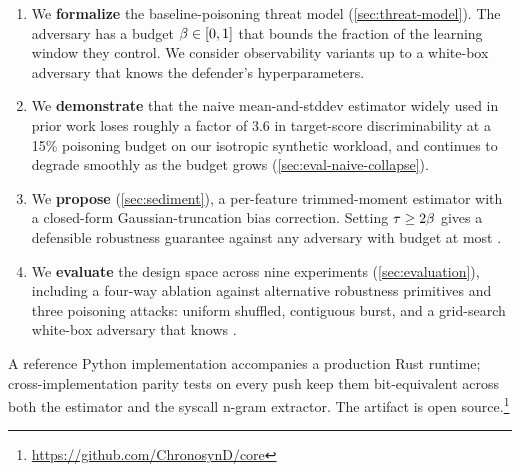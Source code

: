 \begin{enumerate}
\item We \textbf{formalize} the baseline-poisoning threat model
  (\cref{sec:threat-model}). The adversary has a budget
  $\beta \in [0, 1]$ that bounds the fraction of the learning
  window they control. We consider observability variants up to a
  white-box adversary that knows the defender's hyperparameters.
\item We \textbf{demonstrate} that the naive mean-and-stddev
  estimator widely used in prior work loses roughly a factor of
  3.6 in target-score discriminability at a 15\% poisoning budget on
  our isotropic synthetic workload, and continues to degrade
  smoothly as the budget grows
  (\cref{sec:eval-naive-collapse}).
\item We \textbf{propose} \sediment{} (\cref{sec:sediment}), a
  per-feature trimmed-moment estimator with a closed-form
  Gaussian-truncation bias correction. Setting $\tau{} \geq 2\beta$
  gives a defensible robustness guarantee against any adversary with
  budget at most \budget{}.
\item We \textbf{evaluate} the design space across nine experiments
  (\cref{sec:evaluation}), including a four-way ablation against
  alternative robustness primitives and three poisoning attacks:
  uniform shuffled, contiguous burst, and a grid-search white-box
  adversary that knows \trim{}.
\end{enumerate}

A reference Python implementation accompanies a production Rust
runtime; cross-implementation parity tests on every push keep them
bit-equivalent across both the estimator and the syscall n-gram
extractor. The artifact is open
source.\footnote{\url{https://github.com/ChronosynD/core}}
